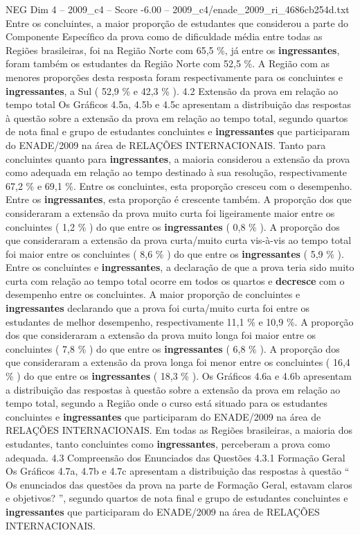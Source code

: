 \begin{textsample}{NEG Dim 4 – 2009\_c4 – Score -6.00 – 2009\_c4/enade\_2009\_ri\_4686cb254d.txt}
Entre os concluintes, a maior proporção de estudantes que considerou a parte do Componente Específico da prova como de dificuldade média entre todas as Regiões brasileiras, foi na Região Norte com 65,5 \%, já entre os \textbf{ingressantes}, foram também os estudantes da Região Norte com 52,5 \%.
A Região com as menores proporções desta resposta foram respectivamente para os concluintes e \textbf{ingressantes}, a Sul ( 52,9 \% e 42,3 \% ). 4.2 Extensão da prova em relação ao tempo total Os Gráficos 4.5a, 4.5b e 4.5c apresentam a distribuição das respostas à questão sobre a extensão da prova em relação ao tempo total, segundo quartos de nota final e grupo de estudantes concluintes e \textbf{ingressantes} que participaram do ENADE/2009 na área de RELAÇÕES INTERNACIONAIS.
Tanto para concluintes quanto para \textbf{ingressantes}, a maioria considerou a extensão da prova como adequada em relação ao tempo destinado à sua resolução, respectivamente 67,2 \% e 69,1 \%.
Entre os concluintes, esta proporção cresceu com o desempenho.
Entre os \textbf{ingressantes}, esta proporção é crescente também.
A proporção dos que consideraram a extensão da prova muito curta foi ligeiramente maior entre os concluintes ( 1,2 \% ) do que entre os \textbf{ingressantes} ( 0,8 \% ).
A proporção dos que consideraram a extensão da prova curta/muito curta vis-à-vis ao tempo total foi maior entre os concluintes ( 8,6 \% ) do que entre os \textbf{ingressantes} ( 5,9 \% ).
Entre os concluintes e \textbf{ingressantes}, a declaração de que a prova teria sido muito curta com relação ao tempo total ocorre em todos os quartos e \textbf{decresce} com o desempenho entre os concluintes.
A maior proporção de concluintes e \textbf{ingressantes} declarando que a prova foi curta/muito curta foi entre os estudantes de melhor desempenho, respectivamente 11,1 \% e 10,9 \%.
A proporção dos que consideraram a extensão da prova muito longa foi maior entre os concluintes ( 7,8 \% ) do que entre os \textbf{ingressantes} ( 6,8 \% ).
A proporção dos que consideraram a extensão da prova longa foi menor entre os concluintes ( 16,4 \% ) do que entre os \textbf{ingressantes} ( 18,3 \% ).
Os Gráficos 4.6a e 4.6b apresentam a distribuição das respostas à questão sobre a extensão da prova em relação ao tempo total, segundo a Região onde o curso está situado para os estudantes concluintes e \textbf{ingressantes} que participaram do ENADE/2009 na área de RELAÇÕES INTERNACIONAIS.
Em todas as Regiões brasileiras, a maioria dos estudantes, tanto concluintes como \textbf{ingressantes}, perceberam a prova como adequada. 4.3 Compreensão dos Enunciados das Questões 4.3.1 Formação Geral Os Gráficos 4.7a, 4.7b e 4.7c apresentam a distribuição das respostas à questão “ Os enunciados das questões da prova na parte de Formação Geral, estavam claros e objetivos? ”, segundo quartos de nota final e grupo de estudantes concluintes e \textbf{ingressantes} que participaram do ENADE/2009 na área de RELAÇÕES INTERNACIONAIS.

\end{textsample}
